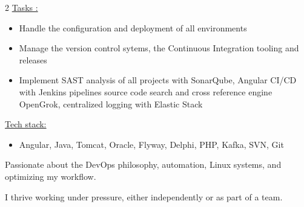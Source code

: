 \documentclass[10pt,a4paper,withhyper]{altacv}
\begin{document}
\begin{paracol}{2}
\underline{Tasks :}
\begin{itemize}
\item Handle the configuration and deployment of all environments
\item Manage the version control sytems, the Continuous Integration tooling and releases
\item Implement SAST analysis of all projects with SonarQube, Angular CI/CD with Jenkins pipelines source code search and cross reference engine OpenGrok, centralized logging with Elastic Stack
\end{itemize}
\underline{Tech stack:}
\begin{itemize}
\item Angular, Java, Tomcat, Oracle, Flyway, Delphi, PHP, Kafka, SVN, Git
\end{itemize}

%
%
%
%
%
\newpage

\switchcolumn


Passionate about the DevOps philosophy, automation, Linux systems, and optimizing my workflow.

I thrive working under pressure, either independently or as part of a team.



\divider\smallskip


%
%



\end{paracol}
\end{document}

